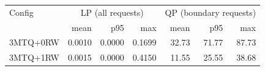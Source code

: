 \begin{tabular}{lrrrrrr}
\toprule
Config & \multicolumn{3}{c}{LP (all requests)} & \multicolumn{3}{c}{QP (boundary requests)} \\
 & mean & p95 & max & mean & p95 & max \\
\midrule
3MTQ+0RW & 0.0010 & 0.0000 & 0.1699 & 32.73 & 71.77 & 87.73 \\
3MTQ+1RW & 0.0015 & 0.0000 & 0.4150 & 11.55 & 25.55 & 38.68 \\
\bottomrule
\end{tabular}
